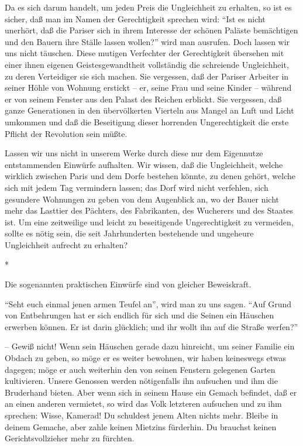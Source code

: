 \documentclass{scrbook}
\begin{document}
Da es sich darum handelt, um jeden Preis die Ungleichheit zu erhalten, so ist es sicher, daß man im Namen der Gerechtigkeit sprechen wird: ``Ist es nicht unerhört, daß die Pariser sich in ihrem Interesse der schönen Paläste bemächtigen und den Bauern ihre Ställe lassen wollen?'' wird man ausrufen. Doch lassen wir uns nicht täuschen. Diese mutigen Verfechter der Gerechtigkeit übersehen mit einer ihnen eigenen Geistesgewandtheit vollständig die schreiende Ungleichheit, zu deren Verteidiger sie sich machen. Sie vergessen, daß der Pariser Arbeiter in seiner Höhle von Wohnung erstickt – er, seine Frau und seine Kinder – während er von seinem Fenster aus den Palast des Reichen erblickt. Sie vergessen, daß ganze Generationen in den übervölkerten Vierteln aus Mangel an Luft und Licht umkommen und daß die Beseitigung dieser horrenden Ungerechtigkeit die erste Pflicht der Revolution sein müßte.

Lassen wir uns nicht in unserem Werke durch diese nur dem Eigennutze entstammenden Einwürfe aufhalten. Wir wissen, daß die Ungleichheit, welche wirklich zwischen Paris und dem Dorfe bestehen könnte, zu denen gehört, welche sich mit jedem Tag vermindern lassen; das Dorf wird nicht verfehlen, sich gesundere Wohnungen zu geben von dem Augenblick an, wo der Bauer nicht mehr das Lasttier des Pächters, des Fabrikanten, des Wucherers und des Staates ist. Um eine zeitweilige und leicht zu beseitigende Ungerechtigkeit zu vermeiden, sollte es nötig sein, die seit Jahrhunderten bestehende und ungeheure Ungleichheit aufrecht zu erhalten?

\begin{center}*\end{center}

Die sogenannten praktischen Einwürfe sind von gleicher Beweiskraft.

``Seht euch einmal jenen armen Teufel an'', wird man zu uns sagen. ``Auf Grund von Entbehrungen hat er sich endlich für sich und die Seinen ein Häuschen erwerben können. Er ist darin glücklich; und ihr wollt ihn auf die Straße werfen?''

– Gewiß nicht! Wenn sein Häuschen gerade dazu hinreicht, um seiner Familie ein Obdach zu geben, so möge er es weiter bewohnen, wir haben keineswegs etwas dagegen; möge er auch weiterhin den von seinen Fenstern gelegenen Garten kultivieren. Unsere Genossen werden nötigenfalls ihn aufsuchen und ihm die Bruderhand bieten. Aber wenn sich in seinem Hause ein Gemach befindet, daß er an einen anderen vermietet, so wird das Volk letzteren aufsuchen und zu ihm sprechen: Wisse, Kamerad! Du schuldest jenem Alten nichts mehr. Bleibe in deinem Gemache, aber zahle keinen Mietzins fürderhin. Du brauchst keinen Gerichtsvollzieher mehr zu fürchten.
\end{document}
